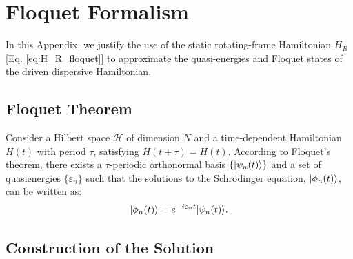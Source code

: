 \section{Floquet Formalism}
\label{app:floquet}
In this Appendix, we justify the use of the static rotating-frame Hamiltonian $H_R$ [Eq. \eqref{eq:H_R_floquet}] to approximate the quasi-energies and Floquet states of the driven dispersive Hamiltonian.

\subsection{Floquet Theorem}
Consider a Hilbert space $\mathcal{H}$ of dimension $N$ and a time-dependent Hamiltonian $H(t)$ with period $\tau$, satisfying $H(t+\tau) = H(t)$. According to Floquet's theorem, there exists a $\tau$-periodic orthonormal basis $\{|\psi_n(t)\rangle\}$ and a set of quasienergies $\{\varepsilon_n\}$ such that the solutions to the Schrödinger equation, $|\phi_n(t)\rangle$, can be written as:
\begin{equation}
    |\phi_n(t)\rangle = e^{-i\varepsilon_n t} |\psi_n(t)\rangle.
\end{equation}

\subsection{Construction of the Solution}

